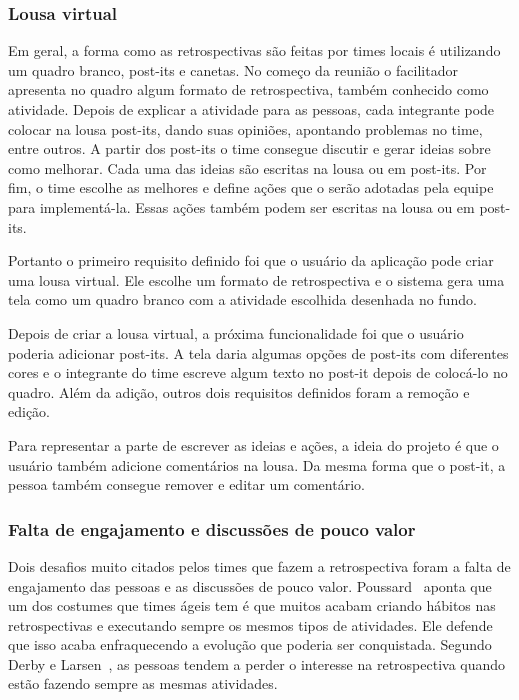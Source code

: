 \subsubsection*{Lousa virtual}

Em geral, a forma como as retrospectivas são feitas por times locais é utilizando um quadro branco, post-its e canetas. No começo da reunião o facilitador apresenta no quadro algum formato de retrospectiva, também conhecido como atividade. Depois de explicar a atividade para as pessoas, cada integrante pode colocar na lousa post-its, dando suas opiniões, apontando problemas no time, entre outros. A partir dos post-its o time consegue discutir e gerar ideias sobre como melhorar. Cada uma das ideias são escritas na lousa ou em post-its. Por fim, o time escolhe as melhores e define ações que o serão adotadas pela equipe para implementá-la. Essas ações também podem ser escritas na lousa ou em post-its.

Portanto o primeiro requisito definido foi que o usuário da aplicação pode criar uma lousa virtual. Ele escolhe um formato de retrospectiva e o sistema gera uma tela como um quadro branco com a atividade escolhida desenhada no fundo.

Depois de criar a lousa virtual, a próxima funcionalidade foi que o usuário poderia adicionar post-its. A tela daria algumas opções de post-its com diferentes cores e o integrante do time escreve algum texto no post-it depois de colocá-lo no quadro. Além da adição, outros dois requisitos definidos foram a remoção e edição.

Para representar a parte de escrever as ideias e ações, a ideia do projeto é que o usuário também adicione comentários na lousa. Da mesma forma que o post-it, a pessoa também consegue remover e editar um comentário.

\subsubsection*{Falta de engajamento e discussões de pouco valor}

Dois desafios muito citados pelos times que fazem a retrospectiva foram a falta de engajamento das pessoas e as discussões de pouco valor. Poussard~\cite{poussard} aponta que um dos costumes que times ágeis tem é que muitos acabam criando hábitos nas retrospectivas e executando sempre os mesmos tipos de atividades. Ele defende que isso acaba enfraquecendo a evolução que poderia ser conquistada. Segundo Derby e Larsen~\cite{retrospectives},  as pessoas tendem a perder o interesse na retrospectiva quando estão fazendo sempre as mesmas atividades.


